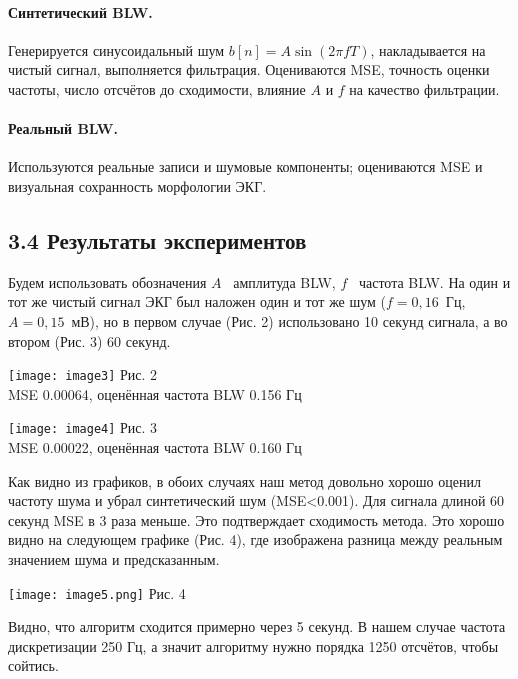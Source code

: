 \documentclass[10pt,a5paper]{article}
\numberwithin{figure}{section}
\numberwithin{table}{section}
\begin{document}
\paragraph{Синтетический BLW.} Генерируется синусоидальный шум $b[n] = A \sin(2\pi f T)$, накладывается на чистый сигнал, выполняется фильтрация. Оцениваются MSE, точность оценки частоты, число отсчётов до сходимости, влияние $A$ и $f$ на качество фильтрации.
\paragraph{Реальный BLW.} Используются реальные записи и шумовые компоненты; оцениваются MSE и визуальная сохранность морфологии ЭКГ.

\subsection{3.4 Результаты экспериментов}
Будем использовать обозначения $A$ \textendash\ амплитуда BLW, $f$ \textendash\ частота BLW. На один и тот же чистый сигнал ЭКГ был наложен один и тот же шум ($f=0{,}16$~Гц, $A=0{,}15$~мВ), но в первом случае (Рис. 2) использовано 10 секунд сигнала, а во втором (Рис. 3) 60 секунд.

\noindent
\begin{minipage}[t]{0.48\textwidth}
    \centering
    \texttt{[image: image3]}
    \centering Рис. 2\\MSE 0.00064, оценённая частота BLW 0.156 Гц
    \label{fig:image3}
\end{minipage}
\hfill
\begin{minipage}[t]{0.48\textwidth}
    \centering
    \texttt{[image: image4]}
    \centering Рис. 3\\MSE 0.00022, оценённая частота BLW 0.160 Гц
    \label{fig:image4}
\end{minipage}


\medskip
Как видно из графиков, в обоих случаях наш метод довольно хорошо оценил частоту шума и убрал синтетический шум (MSE<0.001). Для сигнала длиной 60 секунд MSE в 3 раза меньше. Это подтверждает сходимость метода. Это хорошо видно на следующем графике (Рис. 4), где изображена разница между реальным значением шума и предсказанным.

\noindent
\begin{minipage}{0.60\textwidth}
	\centering
    \texttt{[image: image5.png]}
    \centering Рис. 4
    \label{fig:image5}
\end{minipage}
\hfill
\begin{minipage}{0.36\textwidth}
        Видно, что алгоритм сходится примерно через 5 секунд. В нашем случае частота дискретизации 250 Гц, а значит алгоритму нужно порядка 1250 отсчётов, чтобы сойтись.
\end{minipage}
\medskip
\end{document}
